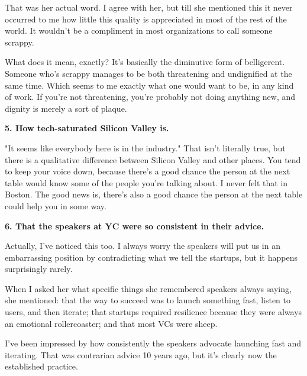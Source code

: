 That was her
                  actual word. I agree with her, but till she mentioned this it
                  never occurred to me how little this quality is appreciated in
                  most of the rest of the world. It wouldn't be a compliment in
                  most organizations to call someone scrappy.

What
                  does it mean, exactly? It's basically the diminutive form of
                  belligerent. Someone who's scrappy manages to be both
                  threatening and undignified at the same time. Which seems to
                  me exactly what one would want to be, in any kind of work. If
                  you're not threatening, you're probably not doing anything
                  new, and dignity is merely a sort of plaque.


                  \textbf{5. How tech-saturated Silicon Valley is.}

"It
                  seems like everybody here is in the industry." That isn't
                  literally true, but there is a qualitative difference between
                  Silicon Valley and other places. You tend to keep your voice
                  down, because there's a good chance the person at the next
                  table would know some of the people you're talking about. I
                  never felt that in Boston. The good news is, there's also a
                  good chance the person at the next table could help you in
                  some way.


                  \textbf{6. That the speakers at YC were so consistent in their
                    advice.}


                  Actually, I've noticed this too. I always worry the speakers
                  will put us in an embarrassing position by contradicting what
                  we tell the startups, but it happens surprisingly rarely.

When
                  I asked her what specific things she remembered speakers
                  always saying, she mentioned: that the way to succeed was to
                  launch something fast, listen to users, and then iterate; that
                  startups required resilience because they were always an
                  emotional rollercoaster; and that most VCs were sheep.

I've
                  been impressed by how consistently the speakers advocate
                  launching fast and iterating. That was contrarian advice 10
                  years ago, but it's clearly now the established practice.


